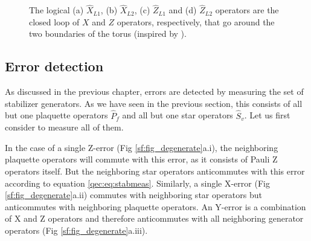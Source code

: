 \begin{figure}
  \centering
  \hspace{1cm}
  \caption{The logical (a) $\hat{X}_{L1}$, (b) $\hat{X}_{L2}$, (c) $\hat{Z}_{L1}$ and (d) $\hat{Z}_{L2}$ operators are the closed loop of $X$ and $Z$ operators, respectively, that go around the two boundaries of the torus (inspired by \cite{browne}).}\label{sf:fig_logical}
\end{figure}

\subsection{Error detection}
As discussed in the previous chapter, errors are detected by measuring the set of stabilizer generators. As we have seen in the previous section, this consists of all but one plaquette operators $\hat{P}_f$ and all but one star operators $\hat{S}_v$. Let us first consider to measure all of them.

In the case of a single Z-error (Fig \ref{sf:fig_degenerate}a.i), the neighboring plaquette operators will commute with this error, as it consists of Pauli Z operators itself. But the neighboring star operators anticommutes with this error according to equation \eqref{qec:eq:stabmeas}. Similarly, a single X-error (Fig \ref{sf:fig_degenerate}a.ii) commutes with neighboring star operators but anticommutes with neighboring plaquette operators. An Y-error is a combination of X and Z operators and therefore anticommutes with all neighboring generator operators (Fig \ref{sf:fig_degenerate}a.iii).


